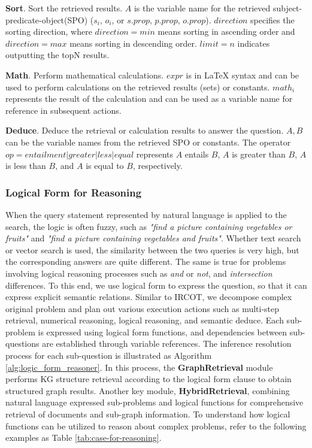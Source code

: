 \documentclass{article}
\begin{document}
\textbf{Sort}. Sort the retrieved results. $A$ is the variable name for the retrieved subject-predicate-object(SPO) ($s_{i}$, $o_{i}$, or $s.prop$, $p.prop$, $o.prop$). $direction$ specifies the sorting direction, where $direction=min$ means sorting in ascending order and $direction=max$ means sorting in descending order. $limit=n$ indicates outputting the topN results.

\textbf{Math}. Perform mathematical calculations. $expr$ is in LaTeX syntax and can be used to perform calculations on the retrieved results (sets) or constants. $math_{i}$ represents the result of the calculation and can be used as a variable name for reference in subsequent actions.

\textbf{Deduce}. Deduce the retrieval or calculation results to answer the question. $A,B$ can be the variable names from the retrieved SPO or constants. The operator $op=entailment|greater|less|equal$ represents $A$ entails $B$, $A$ is greater than $B$, $A$ is less than $B$, and $A$ is equal to $B$, respectively.


\subsubsection{Logical Form for Reasoning}
When the query statement represented by natural language is applied to the search, the logic is often fuzzy, such as \textit{"find a picture containing vegetables or fruits"} and \textit{"find a picture containing vegetables and fruits"}. Whether text search or vector search is used, the similarity between the two queries is very high, but the corresponding answers are quite different. The same is true for problems involving logical reasoning processes such as \textit{and} or \textit{not}, and \textit{intersection} differences. To this end, we use logical form to express the question, so that it can express explicit semantic relations.
Similar to IRCOT, we decompose complex original problem and plan out various execution actions such as multi-step retrieval, numerical reasoning, logical reasoning, and semantic deduce. Each sub-problem is expressed using logical form functions, and dependencies between sub-questions are established through variable references. The inference resolution process for each sub-question is illustrated as Algorithm \ref{alg:logic_form_reasoner}. In this process, the  \textbf{GraphRetrieval} module performs KG structure retrieval according to the logical form clause to obtain structured graph results. Another key module, \textbf{HybridRetrieval}, combining natural language expressed sub-problems and logical functions for comprehensive retrieval of documents and sub-graph information. To understand how logical functions can be utilized to reason about complex problems, refer to the following examples as Table \ref{tab:case-for-reasoning}.
\end{document}
